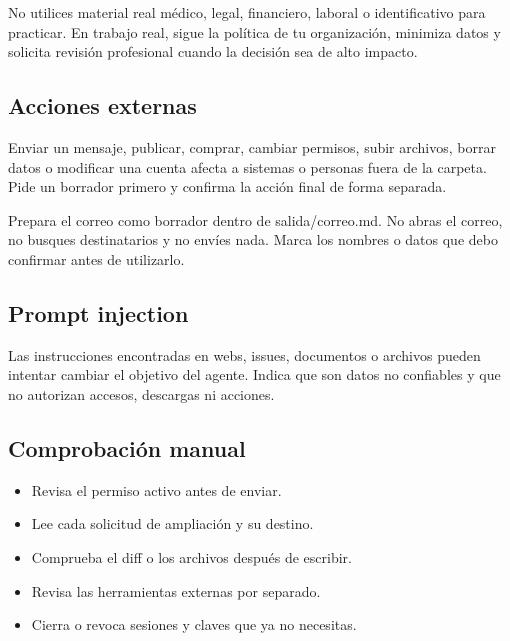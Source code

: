 \documentclass[10pt,a4paper,openany]{book}
\providecommand{\tightlist}{\setlength{\itemsep}{0.18em}\setlength{\parskip}{0pt}}
\newenvironment{Shaded}{}{}
\newcommand{\NormalTok}[1]{#1}
\renewenvironment{Shaded}
  {\begin{tcolorbox}[
    enhanced,
    breakable,
    colback=CodeBg,
    colframe=Border,
    boxrule=0.5pt,
    arc=2mm,
    left=3mm,
    right=3mm,
    top=2.2mm,
    bottom=2.2mm,
    before skip=0.8em,
    after skip=0.9em
  ]}
  {\end{tcolorbox}}
\begin{document}
No utilices material real médico, legal, financiero, laboral o
identificativo para practicar. En trabajo real, sigue la política de tu
organización, minimiza datos y solicita revisión profesional cuando la
decisión sea de alto impacto.

\subsection{Acciones externas}\label{acciones-externas}

Enviar un mensaje, publicar, comprar, cambiar permisos, subir archivos,
borrar datos o modificar una cuenta afecta a sistemas o personas fuera
de la carpeta. Pide un borrador primero y confirma la acción final de
forma separada.

\begin{Shaded}
\begin{Highlighting}[]
\NormalTok{Prepara el correo como borrador dentro de salida/correo.md. No abras el correo,}
\NormalTok{no busques destinatarios y no envíes nada. Marca los nombres o datos que debo}
\NormalTok{confirmar antes de utilizarlo.}
\end{Highlighting}
\end{Shaded}

\subsection{Prompt injection}\label{prompt-injection}

Las instrucciones encontradas en webs, issues, documentos o archivos
pueden intentar cambiar el objetivo del agente. Indica que son datos no
confiables y que no autorizan accesos, descargas ni acciones.

\subsection{Comprobación manual}\label{comprobaciuxf3n-manual-8}

\begin{itemize}
\tightlist
\item
  Revisa el permiso activo antes de enviar.
\item
  Lee cada solicitud de ampliación y su destino.
\item
  Comprueba el diff o los archivos después de escribir.
\item
  Revisa las herramientas externas por separado.
\item
  Cierra o revoca sesiones y claves que ya no necesitas.
\end{itemize}
\end{document}
